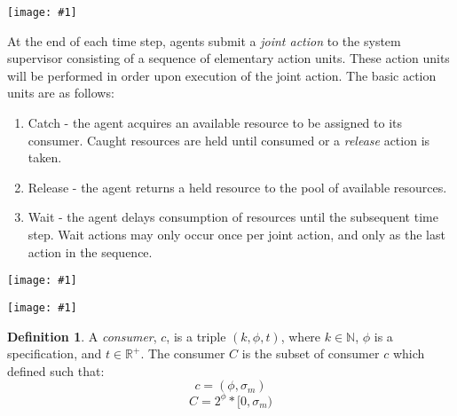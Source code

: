 \documentclass{article}
\theoremstyle{definition}
\newtheorem{definition}{Definition}[section]
\theoremstyle{remark}
\newcommand{\addpic}[1]{\texttt{[image: \#1]}}
\begin{document}
	
	
	
	
	


	\addpic{figures/Joint-action.jpg}

	
	
	At the end of each time step, agents submit a \emph{joint action} to the system supervisor consisting of a sequence of elementary action units. These action units will be performed in order upon execution of the joint action. The basic action units are as follows:
	
	\begin{enumerate}
		\item Catch - the agent acquires an available resource to be assigned to its consumer. Caught resources are held until consumed or a \emph{release} action is taken.
		\item Release - the agent returns a held resource to the pool of available resources.
		\item Wait - the agent delays consumption of resources until the subsequent time step. Wait actions may only occur once per joint action, and only as the last action in the sequence.
	\end{enumerate}
	
	\newpage
	
	\addpic{figures/Neural-Network.jpeg}
	
	\addpic{figures/Policy-Generator.png}	
	
	\iffalse
	
		\begin{definition}
			A \emph{consumer}, $c$, is a triple $(k, \phi, t)$, where $k \in \mathbb{N}$, $\phi$ is a specification, and $t \in \mathbb{R}^{+}$. The consumer $C$ is the subset of consumer $c$ which defined such that:
			\[
			c = (\phi , \sigma_m)
			\]
			\[
			C = 2^{\phi}*[0,\sigma_m)
			\]
		\end{definition}
		
\end{document}
